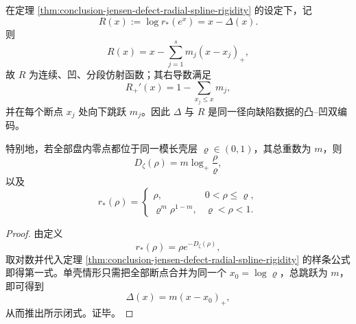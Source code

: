 \begin{corollary}[排斥半径曲线的对偶样条与单壳闭式]\label{cor:conclusion-exclusion-radius-concave-spline}
在定理 \ref{thm:conclusion-jensen-defect-radial-spline-rigidity} 的设定下，记
\[
R(x):=\log r_*(e^x)=x-\Delta(x).
\]
则
\[
R(x)=x-\sum_{j=1}^s m_j(x-x_j)_+,
\]
故 \(R\) 为连续、凹、分段仿射函数；其右导数满足
\[
R_+'(x)=1-\sum_{x_j\le x}m_j,
\]
并在每个断点 \(x_j\) 处向下跳跃 \(m_j\)。因此 \(\Delta\) 与 \(R\) 是同一径向缺陷数据的凸--凹双编码。

特别地，若全部盘内零点都位于同一模长壳层 \(\varrho\in(0,1)\)，其总重数为 \(m\)，则
\[
D_\zeta(\rho)=m\log_+\frac{\rho}{\varrho},
\]
以及
\[
r_*(\rho)=
\begin{cases}
\rho,& 0<\rho\le \varrho,\\[4pt]
\varrho^m\rho^{1-m},& \varrho<\rho<1.
\end{cases}
\]
\end{corollary}
\begin{proof}
由定义
\[
r_*(\rho)=\rho e^{-D_\zeta(\rho)},
\]
取对数并代入定理 \ref{thm:conclusion-jensen-defect-radial-spline-rigidity} 的样条公式即得第一式。单壳情形只需把全部断点合并为同一个 \(x_0=\log \varrho\)，总跳跃为 \(m\)，即可得到
\[
\Delta(x)=m(x-x_0)_+,
\]
从而推出所示闭式。证毕。
\end{proof}


